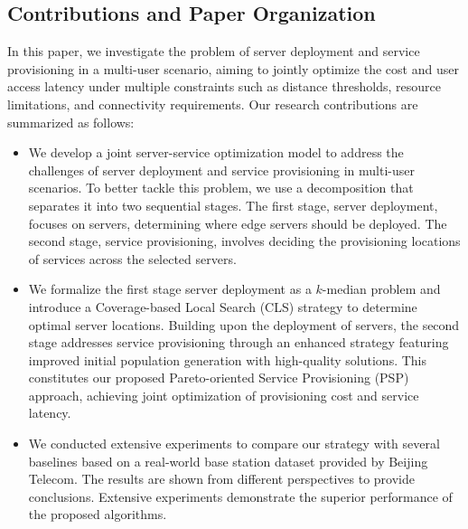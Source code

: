\documentclass[10pt, conference, letterpaper]{IEEEtran}
\begin{document}

\subsection{Contributions and Paper Organization}
In this paper, we investigate the problem of server deployment and service provisioning in a multi-user scenario, aiming to jointly optimize the cost and user access latency under multiple constraints such as distance thresholds, resource limitations, and connectivity requirements. Our research contributions are summarized as follows:
\begin{itemize}
  \item We develop a joint server-service optimization model to address the challenges of server deployment and service provisioning in multi-user scenarios. To better tackle this problem, we use a decomposition that separates it into two sequential stages. The first stage, server deployment, focuses on servers, determining where edge servers should be deployed. The second stage, service provisioning, involves deciding the provisioning locations of services across the selected servers. 
  \item We formalize the first stage server deployment as a $k$-median problem and introduce a Coverage-based Local Search (CLS) strategy to determine optimal server locations. Building upon the deployment of servers, the second stage addresses service provisioning through an enhanced strategy featuring improved initial population generation with high-quality solutions. This constitutes our proposed Pareto-oriented Service Provisioning (PSP) approach, achieving joint optimization of provisioning cost and service latency.
  \item We conducted extensive experiments to compare our strategy with several baselines based on a real-world base station dataset provided by Beijing Telecom. The results are shown from different perspectives to provide conclusions. Extensive experiments demonstrate the superior performance of the proposed algorithms.
\end{itemize}
\end{document}
